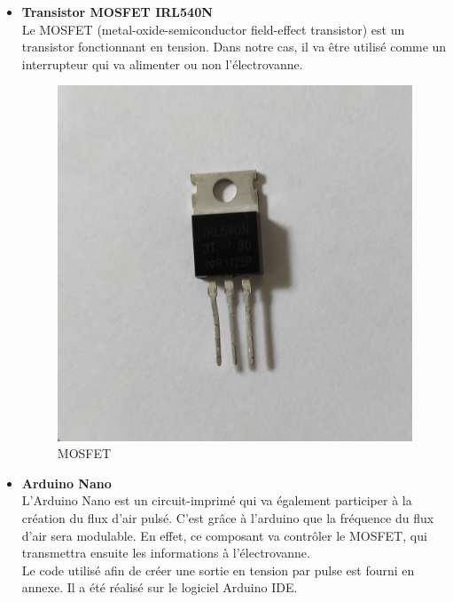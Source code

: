 \begin{itemize}
    \item \textbf{Transistor MOSFET IRL540N}\\
          Le MOSFET (metal-oxide-semiconductor field-effect transistor) est un transistor fonctionnant en tension. Dans notre cas, il va
          être utilisé comme un interrupteur qui va alimenter ou non l'électrovanne.
          \begin{figure}[H]
              \centering
              \includegraphics[scale = 0.05]{assets/figures/mosfet_visuel.jpg}
              \caption{MOSFET}
              \label{fig:mosfet}
          \end{figure}

    \item \textbf{Arduino Nano}\\
          L'Arduino Nano est un circuit-imprimé qui va également participer à la création du flux d'air pulsé. C'est grâce à l'arduino que la
          fréquence du flux d'air sera modulable. En effet, ce composant va contrôler le MOSFET, qui transmettra ensuite les informations à
          l'électrovanne.\\
          Le code utilisé afin de créer une sortie en tension par pulse est fourni en annexe. Il a été réalisé sur le logiciel Arduino IDE.\\

\end{itemize}

